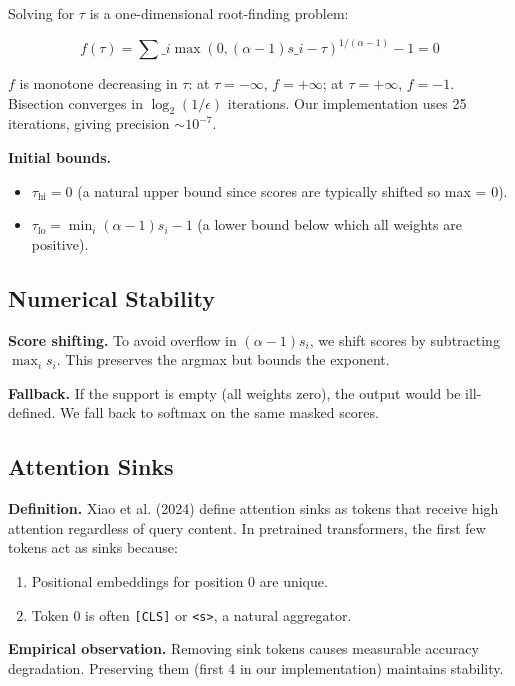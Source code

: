 Solving for $\tau$ is a one-dimensional root-finding problem:

\[
f(\tau) = \sum\_i \max(0, (\alpha - 1) s\_i - \tau)^{1/(\alpha - 1)} - 1 = 0
\tag{3.7}
\]

$f$ is monotone decreasing in $\tau$: at $\tau = -\infty$, $f = +\infty$; 
at $\tau = +\infty$, $f = -1$. Bisection converges in $\log_2(1/\epsilon)$ 
iterations. Our implementation uses 25 iterations, giving precision 
$\sim 10^{-7}$.

\textbf{Initial bounds.}

\begin{itemize}
\item $\tau_\text{hi} = 0$ (a natural upper bound since scores are typically
  shifted so max = 0).
\item $\tau_\text{lo} = \min_i (\alpha - 1) s_i - 1$ (a lower bound below which
  all weights are positive).

\end{itemize}
\subsection{Numerical Stability}

\textbf{Score shifting.} To avoid overflow in $(\alpha - 1) s_i$, we shift scores 
by subtracting $\max_i s_i$. This preserves the argmax but bounds the 
exponent.

\textbf{Fallback.} If the support is empty (all weights zero), the output would be 
ill-defined. We fall back to softmax on the same masked scores.

\subsection{Attention Sinks}

\textbf{Definition.} Xiao et al. (2024) define attention sinks as tokens that 
receive high attention regardless of query content. In pretrained transformers, 
the first few tokens act as sinks because:

\begin{enumerate}
\item Positional embeddings for position 0 are unique.
\item Token 0 is often \texttt{[CLS]} or \texttt{\textless{}s\textgreater{}}, a natural aggregator.

\end{enumerate}
\textbf{Empirical observation.} Removing sink tokens causes measurable accuracy 
degradation. Preserving them (first 4 in our implementation) maintains 
stability.

